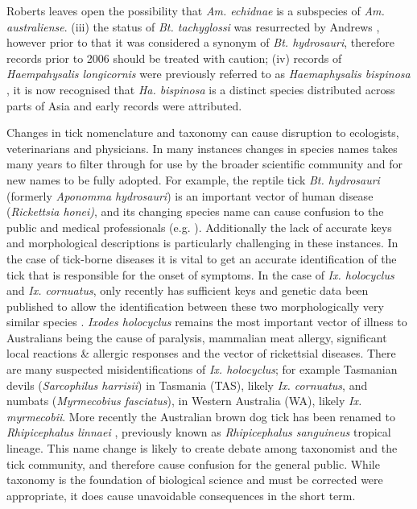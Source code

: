 \documentclass[a4paper, nobind]{templates/ociamthesis}
\begin{document}
Roberts \autocite*{robertsAustralianTicks1970} leaves open the possibility that \emph{Am. echidnae} is a subspecies of \emph{Am. australiense}.
(iii) the status of \emph{Bt. tachyglossi} was resurrected by Andrews \autocite*{andrewsSystematicStatusAponomma2006}, however prior to that it was considered a synonym of \emph{Bt. hydrosauri}, therefore records prior to 2006 should be treated with caution;
(iv) records of \emph{Haempahysalis longicornis} were previously referred to as \emph{Haemaphysalis bispinosa} \autocite{robertsSystematicStudyAustralian1963}, it is now recognised that \emph{Ha. bispinosa} is a distinct species distributed across parts of Asia and early records were attributed.

Changes in tick nomenclature and taxonomy can cause disruption to ecologists, veterinarians and physicians.
In many instances changes in species names takes many years to filter through for use by the broader scientific community and for new names to be fully adopted.
For example, the reptile tick \emph{Bt. hydrosauri} (formerly \emph{Aponomma hydrosauri}) is an important vector of human disease (\emph{Rickettsia honei)}, and its changing species name can cause confusion to the public and medical professionals (e.g. \textcite{stenosAponommaHydrosauriReptileassociated2003}).
Additionally the lack of accurate keys and morphological descriptions is particularly challenging in these instances.
In the case of tick-borne diseases it is vital to get an accurate identification of the tick that is responsible for the onset of symptoms.
In the case of \emph{Ix. holocyclus} and \emph{Ix. cornuatus}, only recently has sufficient keys and genetic data been published to allow the identification between these two morphologically very similar species \autocite{songPhylogeneticPhylogeographicRelationships2011,barkerTicksAustraliaSpecies2014,kwakKeysMorphologicalIdentification2017}.
\emph{Ixodes holocyclus} remains the most important vector of illness to Australians being the cause of paralysis, mammalian meat allergy, significant local reactions \& allergic responses and the vector of rickettsial diseases.
There are many suspected misidentifications of \emph{Ix. holocyclus}; for example Tasmanian devils (\emph{Sarcophilus harrisii}) in Tasmania (TAS), likely \emph{Ix. cornuatus}, and numbats (\emph{Myrmecobius fasciatus}), in Western Australia (WA), likely \emph{Ix. myrmecobii}.
More recently the Australian brown dog tick has been renamed to \emph{Rhipicephalus linnaei} \autocite{slapetaTropicalLineageBrown2021}, previously known as \emph{Rhipicephalus sanguineus} tropical lineage.
This name change is likely to create debate among taxonomist and the tick community, and therefore cause confusion for the general public.
While taxonomy is the foundation of biological science and must be corrected were appropriate, it does cause unavoidable consequences in the short term.
\end{document}
